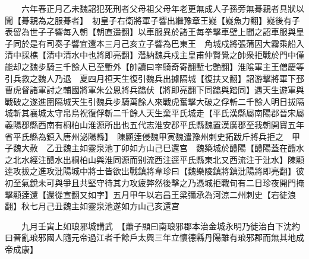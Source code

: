 　　六年春正月乙未魏詔犯死刑者父母祖父母年老更無成人子孫旁無朞親者具狀以聞【朞親為之服朞者】　初皇子右衛將軍子響出繼豫章王嶷【嶷魚力翻】嶷後有子表留為世子子響每入朝【朝直遥翻】以車服異於諸王每拳擊車壁上聞之詔車服與皇子同於是有司奏子響宜還本三月己亥立子響為巴東王　角城戍將張蒲因大霧乘船入清中採樵【清中清水中也將即亮翻】濳納魏兵戍主皇甫仲賢覺之帥衆拒戰於門中僅能却之魏步騎三千餘人已至塹外【帥讀曰率騎奇寄翻塹七艶翻】淮隂軍主王僧慶等引兵救之魏人乃退　夏四月桓天生復引魏兵出據隔城【復扶又翻】詔游擊將軍下邳曹虎督諸軍討之輔國將軍朱公恩將兵蹹伏【將即亮翻下同蹹與踏同】遇天生遊軍與戰破之遂進圍隔城天生引魏兵步騎萬餘人來戰虎奮擊大破之俘斬二千餘人明日拔隔城斬其襄城太守帛烏祝復俘斬二千餘人天生棄平氏城走【平氏漢縣屬南陽郡晉宋屬義陽郡縣西南有桐柏山淮源所出也五代志淮安郡平氏縣魏置漢廣郡至我朝開寶五年省平氏縣為鎮入唐州泌陽縣】　陳顯逹侵魏甲寅魏遣豫州刺史拓跋斤將兵拒之　甲子魏大赦　乙丑魏主如靈泉池丁卯如方山己巳還宫　魏築城於醴陽【醴陽蓋在醴水之北水經注醴水出桐柏山與淮同源而别流西注逕平氏縣東北又西流注于沘水】陳顯逹攻拔之進攻沘陽城中將士皆欲出戰鎮將韋珍曰【魏樂陵鎮將鎮沘陽將即亮翻】彼初至氣銳未可與爭且共堅守待其力攻疲弊然後擊之乃憑城拒戰旬有二日珍夜開門掩擊顯逹還【還從宣翻又如字】五月甲午以宕昌王梁彌承為河涼二州刺史【宕徒浪翻】秋七月己丑魏主如靈泉池遂如方山己亥還宫

　　九月壬寅上如琅邪城講武　【蕭子顯曰南琅邪郡本治金城永明乃徙治白下沈約曰晉亂琅邪國人隨元帝過江者千餘戶太興三年立懷德縣丹陽雖有琅邪郡而無其地成帝成康】

